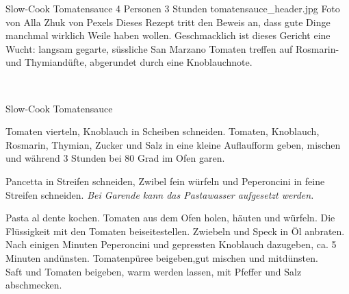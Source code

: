\begin{myrecipe}
    {Slow-Cook Tomatensauce}
    {4 Personen}
    {3 Stunden}
    {tomatensauce_header.jpg}
    {Foto von Alla Zhuk von Pexels}
    \freeform
    \large Dieses Rezept tritt den Beweis an, dass gute Dinge manchmal wirklich Weile haben wollen. Geschmacklich ist dieses Gericht eine Wucht: langsam gegarte, süssliche San Marzano Tomaten treffen auf Rosmarin- und Thymiandüfte, abgerundet durch eine Knoblauchnote.
    \freeform
    \newpage

    \freeform
    \mbox{}\\[-\baselineskip]%
    \parbox[b]{\textwidth}{%
    \rule{0pt}{\baselineskip}%
    \strut{\recipetitlefont Slow-Cook Tomatensauce}\strut\hfill}%

    Tomaten vierteln, Knoblauch in Scheiben schneiden. Tomaten, Knoblauch, Rosmarin, Thymian, Zucker und Salz in eine kleine Auflaufform geben, mischen und während 3 Stunden bei 80 Grad im Ofen garen.

    Pancetta in Streifen schneiden, Zwibel fein würfeln und Peperoncini in feine Streifen schneiden.
    \freeform
    \centering
    \itshape Bei Garende kann das Pastawasser aufgesetzt werden.

    Pasta al dente kochen.
    Tomaten aus dem Ofen holen, häuten und würfeln. Die Flüssigkeit mit den Tomaten beiseitestellen.
    Zwiebeln und Speck in Öl anbraten. Nach einigen Minuten Peperoncini und gepressten Knoblauch dazugeben, ca. 5 Minuten andünsten. Tomatenpüree beigeben,gut mischen und mitdünsten.
    \\Saft und Tomaten beigeben, warm werden lassen, mit Pfeffer und Salz abschmecken.

    
\end{myrecipe}

